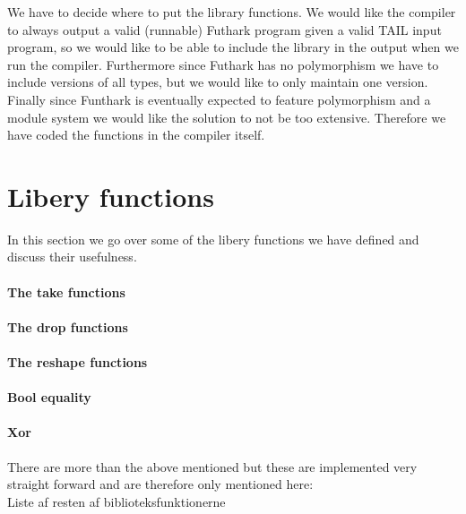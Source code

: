 \documentclass[11pt]{article}
\begin{document}
We have to decide where to put the library functions.
We would like the compiler to always output a valid (runnable) Futhark program given a valid TAIL input program, so we would like to
be able to include the library in the output when we run the compiler.
Furthermore since Futhark has no polymorphism we have to include versions of all types, but we would like to only maintain one version.
Finally since Funthark is eventually expected to feature polymorphism and a module system we would like the solution to not be too
extensive\cite{TroelsHenriksen}. Therefore we have coded the functions in the compiler itself.


\section{Libery functions}
In this section we go over some of the libery functions we have defined and discuss their usefulness.\\

\paragraph{The take functions}

\paragraph{The drop functions}

\paragraph{The reshape functions}

\paragraph{Bool equality}

\paragraph{Xor}

There are more than the above mentioned but these are implemented very straight forward and are therefore only mentioned here: \\

Liste af resten af biblioteksfunktionerne
\end{document}
